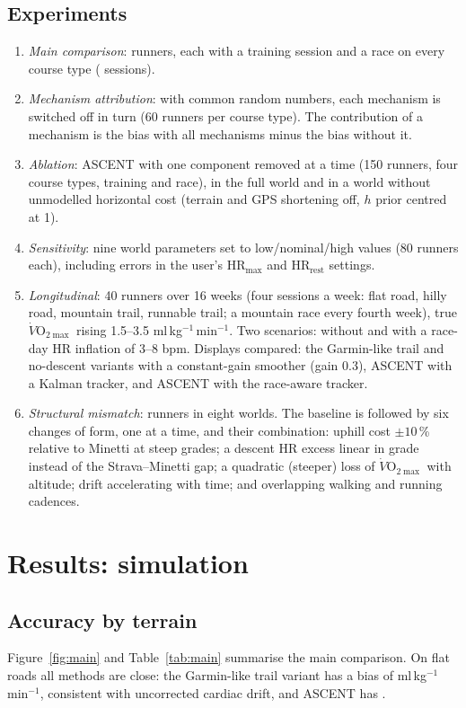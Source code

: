 \documentclass[11pt,a4paper]{article}
\newcommand{\VOmax}{\ensuremath{\dot V\mathrm{O}_{2\max}}}
\newcommand{\unit}{ml\,kg$^{-1}$\,min$^{-1}$}
\newcommand{\HRmax}{\ensuremath{\mathrm{HR}_{\max}}}
\newcommand{\HRrest}{\ensuremath{\mathrm{HR}_{\mathrm{rest}}}}
\newcommand{\ascent}{ASCENT}
\begin{document}
\subsection{Experiments}
\begin{enumerate}[leftmargin=*]
\item \emph{Main comparison}: \nnRunnersMain{} runners, each with a training session and a race on every course type (\nnSessionsMain{} sessions).
\item \emph{Mechanism attribution}: with common random numbers, each mechanism is switched off in turn (60 runners per course type). The contribution of a mechanism is the bias with all mechanisms minus the bias without it.
\item \emph{Ablation}: \ascent{} with one component removed at a time (150 runners, four course types, training and race), in the full world and in a world without unmodelled horizontal cost (terrain and GPS shortening off, $h$ prior centred at 1).
\item \emph{Sensitivity}: nine world parameters set to low/nominal/high values (80 runners each), including errors in the user's \HRmax{} and \HRrest{} settings.
\item \emph{Longitudinal}: 40 runners over 16 weeks (four sessions a week: flat road, hilly road, mountain trail, runnable trail; a mountain race every fourth week), true \VOmax{} rising 1.5--3.5 \unit. Two scenarios: without and with a race-day HR inflation of 3--8 bpm. Displays compared: the Garmin-like trail and no-descent variants with a constant-gain smoother (gain 0.3), \ascent{} with a Kalman tracker, and \ascent{} with the race-aware tracker.
\item \emph{Structural mismatch}: \nnMismatch{} runners in eight worlds. The baseline is followed by six changes of form, one at a time, and their combination: uphill cost $\pm10$\,\% relative to Minetti at steep grades; a descent HR excess linear in grade instead of the Strava--Minetti gap; a quadratic (steeper) loss of \VOmax{} with altitude; drift accelerating with time; and overlapping walking and running cadences.
\end{enumerate}

\section{Results: simulation}\label{sec:simres}

\subsection{Accuracy by terrain}
Figure~\ref{fig:main} and Table~\ref{tab:main} summarise the main comparison. On flat roads all methods are close: the Garmin-like trail variant has a bias of \nbiasGtrailroadflat{} \unit{}, consistent with uncorrected cardiac drift, and \ascent{} has \nbiasASCENTroadflat.
\end{document}
